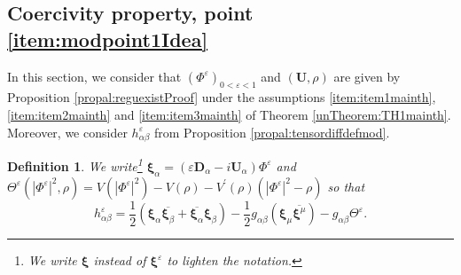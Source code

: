 \documentclass[a4paper, 15pt]{article}
\numberwithin{equation}{section}
\newtheorem{defi}{Definition}[section]
\begin{document}
\subsection{\textbf{Coercivity property}, point \ref{item:modpoint1Idea}}
\label{subsection:Cyproof}
In this section, we consider that $(\Phi^\varepsilon)_{0<\varepsilon<1}$ and $(\textbf{U},\rho)$ are given by Proposition \ref{propal:reguexistProof} under the assumptions \ref{item:item1mainth}, \ref{item:item2mainth} and \ref{item:item3mainth} of Theorem \ref{unTheorem:TH1mainth}. Moreover, we consider $h^\varepsilon_{\alpha\beta}$ from Proposition \ref{propal:tensordiffdefmod}.\\
\begin{defi}
\label{defi:xiCyproof}
    We write\footnote{We write $\boldsymbol{\xi}$ instead of $\boldsymbol{\xi}^\varepsilon$ to lighten the notation.} $\boldsymbol{\xi}_\alpha=(\varepsilon\textbf{D}_\alpha-i\textbf{U}_\alpha)\Phi^\varepsilon$ and $\Theta^\varepsilon(|\Phi^\varepsilon|^2,\rho)=V(|\Phi^\varepsilon|^2)-V(\rho)-V^{\prime}(\rho)(|\Phi^\varepsilon|^2-\rho)$ so that 
\begin{equation}
\label{eq:defh2Cyproof}
h_{\alpha\beta}^\varepsilon=\frac{1}{2}(\boldsymbol{\xi}_\alpha\overline{\boldsymbol{\xi}_\beta}+\overline{\boldsymbol{\xi}_\alpha}\boldsymbol{\xi}_\beta)-\frac{1}{2}g_{\alpha\beta}(\boldsymbol{\xi}_\mu\overline{\boldsymbol{\xi}^\mu})-g_{\alpha\beta}\Theta^\varepsilon.
\end{equation}
\end{defi}
\end{document}
